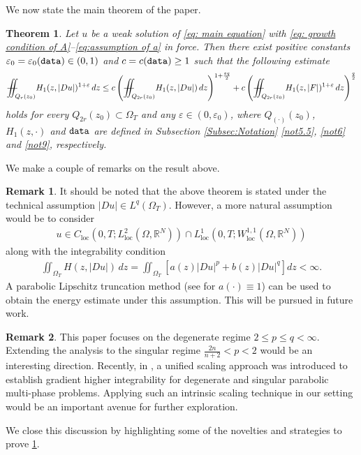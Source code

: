 \documentclass[11pt,oneside, english,reqno,twoside a4paper]{amsart}
\newtheorem{theorem}{Theorem}[section]
\theoremstyle{definition}
\newtheorem{remark}{Remark}[section]
\numberwithin{theorem}{section}
\numberwithin{equation}{section}
\newcommand{\loc}{\mathrm{loc}}
\newcommand{\iintss}{{\int\hspace{-0.28cm}\int}}
\newcommand{ \miints }{{\iintss\hspace{-0.56cm} -\hspace{-0.15cm}-}}
\newcommand{\miint}[1]{{\miints_{\hspace{-0.13cm}#1}}}
\begin{document}
We now state the main theorem of the paper.
\begin{theorem}\label{main_thm}
	Let $u$ be a weak solution of \eqref{eq: main equation} with \eqref{eq: growth condition of A}--\eqref{eq:assumption of a} in force. Then there exist positive constants $\varepsilon_0 = \varepsilon_0(\textnormal{\texttt{data}})\in (0,1)$ and $c=c (\textnormal{\texttt{data}})\geq 1$ such that the following estimate
	\begin{align*}
		\miint{Q_{r}(z_0)} H_1(z, |D u|)^{1+\varepsilon}\, dz \leq c\left(\miint{Q_{2r}(z_0)}H_1(z, |D u|)\,dz\right)^{1+\frac{\varepsilon q}{2}}+ c\left(\miint{Q_{2r}(z_0)}H_1(z, |F|)^{1+\varepsilon}\,dz\right)^{\frac{q}{2}}
	\end{align*}
	holds for every $Q_{2r}(z_0)\subset \Omega_T$ and any $\varepsilon \in (0, \varepsilon_0)$, where $Q_{(\cdot)}(z_0)$, $H_1(z, \cdot)$ and $\textnormal{\texttt{data}}$ are defined in Subsection \ref{Subsec:Notation} \ref{not5.5}, \ref{not6} and \ref{not9}, respectively.
\end{theorem}
We make a couple of remarks on the result above.
\begin{remark}
It should be noted that the above theorem is stated under the technical assumption $|Du|\in L^q(\Omega_T).$ However, a more natural assumption would be to consider
\begin{align*}
u \in C_{\loc}\left(0,T; L^2_{\loc}\left(\Omega, \mathbb{R}^N\right)\right)\cap L^1_{\loc}\left(0, T; W^{1, 1}_{\loc}\left(\Omega, \mathbb{R}^N\right)\right)
\end{align*}
along with the integrability condition
\begin{align*}
\iint_{\Omega_T}H(z, |Du|)\,dz=\iint_{\Omega_T} \left[ a(z)|Du|^p+b(z)|Du|^q \right] dz< \infty.
\end{align*}
A parabolic Lipschitz truncation method (see \cite{KIM2025110738} for $a(\cdot)\equiv 1$) can be used to obtain the energy estimate under this assumption. This will be pursued in future work.
\end{remark}

\begin{remark}
This paper focuses on the degenerate regime $2\leq p\leq q < \infty$. Extending the analysis to the singular regime $\frac{2n}{n+2}<p<2$ would be an interesting direction. Recently, in \cite{S2025}, a unified scaling approach was introduced to establish gradient higher integrability for degenerate and singular parabolic multi-phase problems. Applying such an intrinsic scaling technique in our setting would be an important avenue for further exploration.
\end{remark}
We close this discussion by highlighting some of the novelties and strategies to prove \cref{main_thm}.
\end{document}
